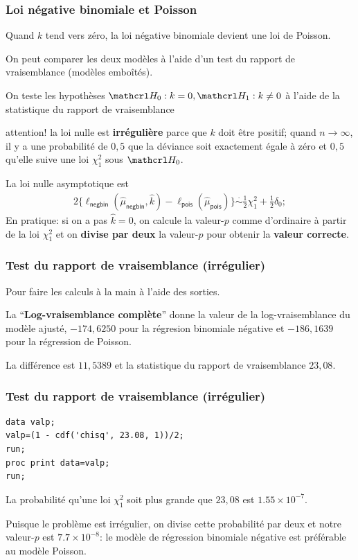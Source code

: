 \documentclass{beamer}
\begin{document}
\begin{frame}[fragile]
\frametitle{Loi négative binomiale et Poisson}
\bi

\item Quand $k$ tend vers zéro, la loi négative binomiale devient une loi de Poisson. 
\item On peut comparer les deux modèles à l'aide d'un test du rapport de vraisemblance (modèles emboîtés). 
\item  On teste les hypothèses $\Hy_0: k=0, \Hy_1: k\neq 0$ à l'aide de la statistique du rapport de vraisemblance
\bi \item attention! la loi nulle est \textbf{irrégulière} parce que $k$ doit être positif;  quand $n \to \infty$,  il y a une probabilité de $0,5$ que la déviance soit exactement égale à zéro et $0,5$ qu'elle suive une loi $\chi^2_1$ sous $\Hy_0$.
\ei
\item La loi nulle asymptotique est
\begin{align*}
2\{\ell_{\mathsf{negbin}}(\hat{\mu}_{\mathsf{negbin}}, \hat{k}) - \ell_{\mathsf{pois}}(\hat{\mu}_{\mathsf{pois}})\} \stackrel{\cdot}{\sim} \frac{1}{2}\chi^2_1 + \frac{1}{2} \delta_0;
\end{align*}
En pratique: si on a pas $\hat{k}=0$, on calcule la valeur-$p$ comme d'ordinaire à partir de la loi $\chi^2_1$  et on \textbf{divise par deux} la valeur-$p$ pour obtenir la \textbf{valeur correcte}.
\ei
\end{frame}
\begin{frame}[fragile]
\frametitle{Test du rapport de vraisemblance (irrégulier)}
Pour faire les calculs à la main à l'aide des sorties.

\bi \item La ``\textbf{Log-vraisemblance complète}'' donne la valeur de la log-vraisemblance du modèle ajusté, $-174,6250$ pour la régresion binomiale négative et $-186,1639$ pour la régression de Poisson.
\item La différence est $11,5389$ et la statistique du rapport de vraisemblance $23,08$.
\ei

\end{frame}
\begin{frame}[fragile]
\frametitle{Test du rapport de vraisemblance (irrégulier)}
\begin{tcolorbox}[colback=white, colframe=hecblue, title=Code SAS pour le test du rapport de vraisemblance (irrégulier)]
{\small 
\begin{verbatim}
data valp;
valp=(1 - cdf('chisq', 23.08, 1))/2;
run;
proc print data=valp;
run;
\end{verbatim}
}
\end{tcolorbox}
\bi \item La probabilité qu'une loi  $\chi^2_1$ soit plus grande que  $23,08$ est $1.55 \times 10^{-7}$.
\item Puisque le problème est irrégulier, on divise cette probabilité par deux et notre valeur-$p$ est $7.7 \times 10^{-8}$: le modèle de régression binomiale négative est préférable au modèle Poisson.
\ei
\end{frame}
\end{document}
